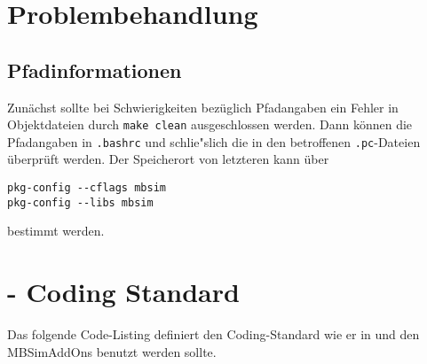 \section{Problembehandlung}
\subsection{Pfadinformationen}
Zun\"achst sollte bei Schwierigkeiten bez\"uglich Pfadangaben ein Fehler in Objektdateien durch \texttt{make clean} ausgeschlossen werden. Dann  k\"onnen die Pfadangaben in \texttt{.bashrc} und schlie"slich die in den betroffenen \texttt{.pc}-Dateien \"uberpr\"uft werden. Der Speicherort von letzteren kann \"uber
\begin{verbatim}
pkg-config --cflags mbsim
pkg-config --libs mbsim
\end{verbatim}
bestimmt werden.

\section{\MBSim{} - Coding Standard}
Das folgende Code-Listing definiert den Coding-Standard wie er in \MBSim{} und den \textsf{MBSimAddOns} benutzt werden sollte.
